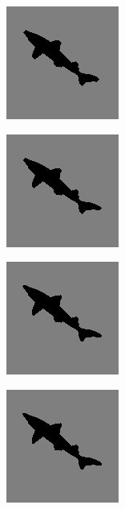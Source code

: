 \documentclass{article}
\begin{document}
\begin{figure}[h]
\caption{}
\centering
\includegraphics{images/rebuilt_image3.jpg}
\end{figure}

\begin{figure}[h]
\caption{}
\centering
\includegraphics{images/rebuilt_image2.jpg}
\end{figure}

\begin{figure}[h]
\caption{}
\centering
\includegraphics{images/rebuilt_image1.jpg}
\end{figure}

\begin{figure}[h]
\caption{}
\centering
\includegraphics{images/rebuilt_image0.jpg}
\end{figure}
\end{document}
